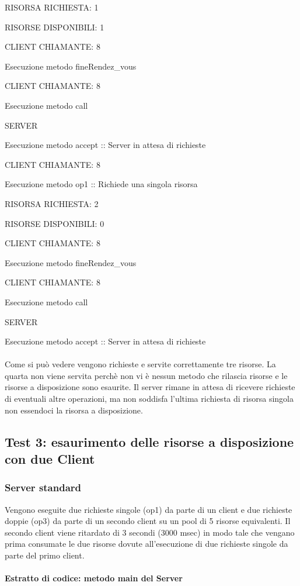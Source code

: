 \documentclass[10pt, a4paper]{article}
\begin{document}
RISORSA RICHIESTA: 1

RISORSE DISPONIBILI: 1

CLIENT CHIAMANTE: 8

Esecuzione metodo fineRendez\_vous

CLIENT CHIAMANTE: 8

Esecuzione metodo call

SERVER

Esecuzione metodo accept :: Server in attesa di richieste

CLIENT CHIAMANTE: 8

Esecuzione metodo op1 :: Richiede una singola risorsa

RISORSA RICHIESTA: 2

RISORSE DISPONIBILI: 0

CLIENT CHIAMANTE: 8

Esecuzione metodo fineRendez\_vous

CLIENT CHIAMANTE: 8

Esecuzione metodo call

SERVER

Esecuzione metodo accept :: Server in attesa di richieste
\\\\
Come si può vedere vengono richieste e servite correttamente tre risorse. La quarta non viene servita perchè non vi è nessun metodo che rilascia risorse e le risorse a disposizione sono esaurite. Il server rimane in attesa di ricevere richieste di eventuali altre operazioni, ma non soddisfa l'ultima richiesta di risorsa singola non essendoci la risorsa a disposizione.
\subsection{Test 3: esaurimento delle risorse a disposizione con due Client}
\subsubsection{Server standard}
Vengono eseguite due richieste singole (op1) da parte di un client e due richieste doppie (op3) da parte di un secondo client su un pool di 5 risorse equivalenti. Il secondo client viene ritardato di 3 secondi (3000 msec) in modo tale che vengano prima consumate le due risorse dovute all'esecuzione di due richieste singole da parte del primo client.
\\\\
\textbf{Estratto di codice: metodo main del Server}
\\
\end{document}
